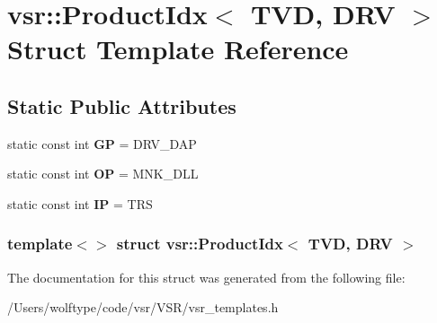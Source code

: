 \hypertarget{structvsr_1_1_product_idx_3_01_t_v_d_00_01_d_r_v_01_4}{\section{vsr\-:\-:Product\-Idx$<$ T\-V\-D, D\-R\-V $>$ Struct Template Reference}
\label{structvsr_1_1_product_idx_3_01_t_v_d_00_01_d_r_v_01_4}
}
\subsection*{Static Public Attributes}
\begin{DoxyCompactItemize}
\item 
\hypertarget{structvsr_1_1_product_idx_3_01_t_v_d_00_01_d_r_v_01_4_a7e82a0352b82a7390e79813835252dc1}{static const int {\bfseries G\-P} = D\-R\-V\-\_\-\-D\-A\-P}\label{structvsr_1_1_product_idx_3_01_t_v_d_00_01_d_r_v_01_4_a7e82a0352b82a7390e79813835252dc1}

\item 
\hypertarget{structvsr_1_1_product_idx_3_01_t_v_d_00_01_d_r_v_01_4_addd8b4f071b3b7a92d6331f70e13bd74}{static const int {\bfseries O\-P} = M\-N\-K\-\_\-\-D\-L\-L}\label{structvsr_1_1_product_idx_3_01_t_v_d_00_01_d_r_v_01_4_addd8b4f071b3b7a92d6331f70e13bd74}

\item 
\hypertarget{structvsr_1_1_product_idx_3_01_t_v_d_00_01_d_r_v_01_4_a2d922eae6cbb7e8e2950db9de4fba8b6}{static const int {\bfseries I\-P} = T\-R\-S}\label{structvsr_1_1_product_idx_3_01_t_v_d_00_01_d_r_v_01_4_a2d922eae6cbb7e8e2950db9de4fba8b6}

\end{DoxyCompactItemize}
\subsubsection*{template$<$$>$ struct vsr\-::\-Product\-Idx$<$ T\-V\-D, D\-R\-V $>$}



The documentation for this struct was generated from the following file\-:\begin{DoxyCompactItemize}
\item 
/\-Users/wolftype/code/vsr/\-V\-S\-R/vsr\-\_\-templates.\-h\end{DoxyCompactItemize}
